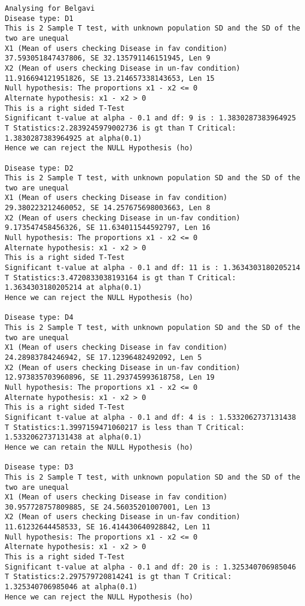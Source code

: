 \documentclass[11pt]{article}
\begin{document}
    \begin{Verbatim}[commandchars=\\\{\}]
Analysing for Belgavi
Disease type: D1
This is 2 Sample T test, with unknown population SD and the SD of the two are unequal
X1 (Mean of users checking Disease in fav condition) 37.593051847437806, SE 32.135791146151945, Len 9
X2 (Mean of users checking Disease in un-fav condition) 11.916694121951826, SE 13.214657338143653, Len 15
Null hypothesis: The proportions x1 - x2 <= 0
Alternate hypothesis: x1 - x2 > 0
This is a right sided T-Test
Significant t-value at alpha - 0.1 and df: 9 is : 1.3830287383964925
T Statistics:2.2839245979002736 is gt than T Critical: 1.3830287383964925 at alpha(0.1)
Hence we can reject the NULL Hypothesis (ho)

Disease type: D2
This is 2 Sample T test, with unknown population SD and the SD of the two are unequal
X1 (Mean of users checking Disease in fav condition) 29.380223212460052, SE 14.257675698003663, Len 8
X2 (Mean of users checking Disease in un-fav condition) 9.173547458456326, SE 11.634011544592797, Len 16
Null hypothesis: The proportions x1 - x2 <= 0
Alternate hypothesis: x1 - x2 > 0
This is a right sided T-Test
Significant t-value at alpha - 0.1 and df: 11 is : 1.3634303180205214
T Statistics:3.4720833038193164 is gt than T Critical: 1.3634303180205214 at alpha(0.1)
Hence we can reject the NULL Hypothesis (ho)

Disease type: D4
This is 2 Sample T test, with unknown population SD and the SD of the two are unequal
X1 (Mean of users checking Disease in fav condition) 24.28983784246942, SE 17.12396482492092, Len 5
X2 (Mean of users checking Disease in un-fav condition) 12.973835703960896, SE 11.293745993618758, Len 19
Null hypothesis: The proportions x1 - x2 <= 0
Alternate hypothesis: x1 - x2 > 0
This is a right sided T-Test
Significant t-value at alpha - 0.1 and df: 4 is : 1.5332062737131438
T Statistics:1.3997159471060217 is less than T Critical: 1.5332062737131438 at alpha(0.1)
Hence we can retain the NULL Hypothesis (ho)

Disease type: D3
This is 2 Sample T test, with unknown population SD and the SD of the two are unequal
X1 (Mean of users checking Disease in fav condition) 30.957728757809885, SE 24.56035201007001, Len 13
X2 (Mean of users checking Disease in un-fav condition) 11.61232644458533, SE 16.414430640928842, Len 11
Null hypothesis: The proportions x1 - x2 <= 0
Alternate hypothesis: x1 - x2 > 0
This is a right sided T-Test
Significant t-value at alpha - 0.1 and df: 20 is : 1.325340706985046
T Statistics:2.297579720814241 is gt than T Critical: 1.325340706985046 at alpha(0.1)
Hence we can reject the NULL Hypothesis (ho)


\end{Verbatim}
\end{document}
